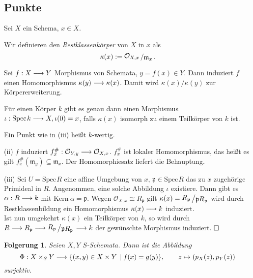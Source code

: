 \documentclass[11pt]{book}
\newtheorem{folg}[theorem]{Folgerung}
\theoremstyle{nonumberbreak}
\newenvironment{pr}[1][]{\ifthenelse{\equal{#1}{}}{\proof}{\proof[#1]}\rm}{\endproof}
\newenvironment{definbem}[1][]{\ifthenelse{\equal{#1}{}}{\definibem}{\definibem[#1]}\rm}{\enddefinibem}
\newcommand{\spec}{\mathrm{Spec} \hspace{1pt} }
\newcommand{\p}{\mathfrak{p}}
\newcommand{\kernel}{\mathrm{Kern}\ }
\newcommand{\slant}[2]{{\raisebox{.1em}{$#1$}\left/\raisebox{-.1em}{$#2$}\right.}}
\begin{document}
\begin{spacing}{1.4}
\renewcommand*\thesection{§ \arabic{section}\quad}
\section{Punkte} %
\renewcommand*\thesection{\arabic{section}}

\begin{definbem}
Sei $X$ ein Schema, $x \in X$.
\begin{compactenum}
\item Wir definieren den \textit{Restklassenkörper} von $X$ in $x$ als
$$\kappa(x) := \slant{\mathcal{O}_{X,x}}{\mathfrak{m}_x}.$$
\item Sei $f: X \longrightarrow Y$ Morphismus von Schemata, $y = f(x) \in Y$. Dann induziert $f$ einen Homomorphismus $\kappa(y) \longrightarrow \kappa(x)$. Damit wird $\kappa(x)/\kappa(y)$ zur Körpererweiterung.
\item Für einen Körper $k$ gibt es genau dann einen Morphismus $\iota: \spec k \la X, \iota(0) = x$, falls $\kappa(x)$ isomorph zu einem Teilkörper von $k$ ist.
\item Ein Punkt wie in (iii) heißt $k$-wertig.
\end{compactenum}
\begin{pr}
\begin{compactenum}
\item[(ii)] $f$ induziert $f_x^\#: \mathcal{O}_{Y,y} \longrightarrow \mathcal{O}_{X,x}$. $f_x^\#$ ist lokaler Homomorphismus, das heißt es gilt $f_x^\#(\mathfrak{m}_y) \subseteq \mathfrak{m}_x$. Der Homomorphiesatz liefert die Behauptung.
\item[(iii)] 
Sei $U= \spec R$ eine affine Umgebung von $x$, $\p \in \spec R$ das zu $x$ zugehörige Primideal in $R$. Angenommen, eine solche Abbildung $\iota$ existiere. Dann gibt es $\alpha: R \longrightarrow k$ mit $\kernel \alpha = \p$. Wegen $\mathcal{O}_{X,x} \cong R_{\p}$ gilt $\kappa(x)= \slant{R_{\p}}{\p R_{\p}}$ wird durch Restklassenbildung ein Homomorphismus $\kappa(x) \longrightarrow k$ induziert.\\
Ist nun umgekehrt $\kappa(x)$ ein Teilkörper von $k$, so wird durch $R\la R_{\p} \la \slant{R_{\p}}{\p R_{\p}} \la k$ der gewünschte Morphismus induziert. $\hfill \Box$
\end{compactenum}
\end{pr}
\end{definbem}


\begin{folg} %
Seien $X,Y$ $S$-Schemata. Dann ist die Abbildung
$$\Phi: X \times_S Y \longrightarrow \{ (x,y) \in X \times Y \ \vert \ f(x) = g(y) \}, \qquad z \mapsto \left(p_X(z), p_Y(z) \right)$$
surjektiv.


\end{folg}
\end{spacing}
\end{document}
